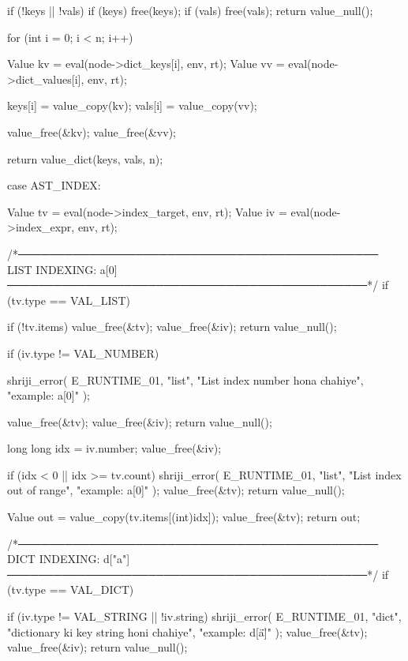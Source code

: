 \documentclass{article}
\begin{document}
{{{        if (!keys || !vals) {
            if (keys) free(keys);
            if (vals) free(vals);
            return value_null();
        }

        for (int i = 0; i < n; i++) {
            Value kv = eval(node->dict_keys[i], env, rt);
            Value vv = eval(node->dict_values[i], env, rt);

            keys[i] = value_copy(kv);
            vals[i] = value_copy(vv);

            value_free(&kv);
            value_free(&vv);
        }

        return value_dict(keys, vals, n);
    }

case AST_INDEX: {

    Value tv = eval(node->index_target, env, rt);
    Value iv = eval(node->index_expr, env, rt);

    /*──────────────────────────────────────────────
      LIST INDEXING: a[0]
    ──────────────────────────────────────────────*/
    if (tv.type == VAL_LIST) {

        if (!tv.items) {
            value_free(&tv);
            value_free(&iv);
            return value_null();
        }

        if (iv.type != VAL_NUMBER) {
            shriji_error(
                E_RUNTIME_01,
                "list",
                "List index number hona chahiye",
                "example: a[0]"
            );

               value_free(&tv);
               value_free(&iv);
               return value_null();
        }

        long long idx = iv.number;
        value_free(&iv);

        if (idx < 0 || idx >= tv.count) {
            shriji_error(
                E_RUNTIME_01,
                "list",
                "List index out of range",
                "example: a[0]"
            );
           value_free(&tv);
           return value_null();
        }

        Value out = value_copy(tv.items[(int)idx]);
        value_free(&tv);
        return out;
    }

    /*──────────────────────────────────────────────
      DICT INDEXING: d["a"]
    ──────────────────────────────────────────────*/
    if (tv.type == VAL_DICT) {

        if (iv.type != VAL_STRING || !iv.string) {
            shriji_error(
                E_RUNTIME_01,
                "dict",
                "dictionary ki key string honi chahiye",
                "example: d[\"a\"]"
            );
            value_free(&tv);
            value_free(&iv);
            return value_null();
        }

}}}}
\end{document}
